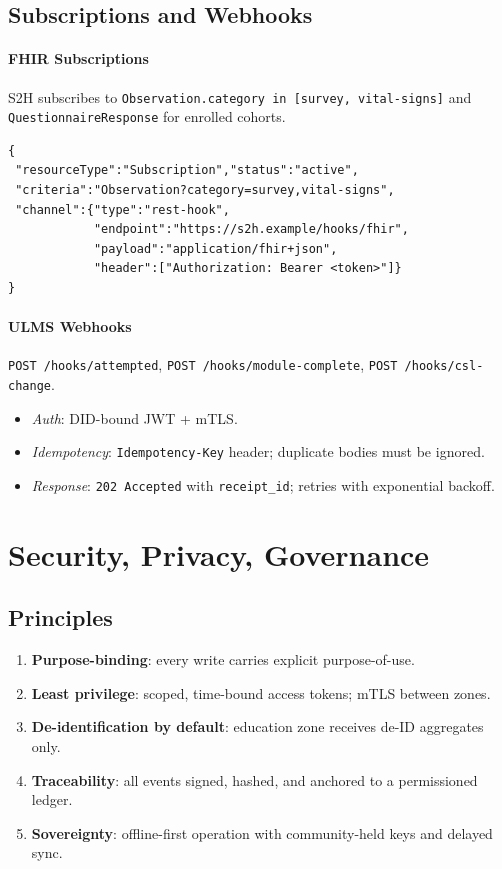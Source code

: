 \documentclass[11pt]{article}
\theoremstyle{plain}
\begin{document}
\bigskip
\subsection{Subscriptions and Webhooks}\label{sec:subs-webhooks}

\paragraph{FHIR Subscriptions}
S2H subscribes to \texttt{Observation.category in [survey, vital-signs]} and \texttt{QuestionnaireResponse} for enrolled cohorts.
\begin{verbatim}
{
 "resourceType":"Subscription","status":"active",
 "criteria":"Observation?category=survey,vital-signs",
 "channel":{"type":"rest-hook",
            "endpoint":"https://s2h.example/hooks/fhir",
            "payload":"application/fhir+json",
            "header":["Authorization: Bearer <token>"]}
}
\end{verbatim}

\paragraph{ULMS Webhooks}
\texttt{POST /hooks/attempted}, \texttt{POST /hooks/module-complete}, \texttt{POST /hooks/csl-change}.
\begin{itemize}
  \item \emph{Auth}: DID-bound JWT + mTLS.
  \item \emph{Idempotency}: \texttt{Idempotency-Key} header; duplicate bodies must be ignored.
  \item \emph{Response}: \texttt{202 Accepted} with \texttt{receipt\_id}; retries with exponential backoff.
\end{itemize}



\section{Security, Privacy, Governance}

\subsection{Principles}
\begin{enumerate}
  \item \textbf{Purpose-binding}: every write carries explicit purpose-of-use.
  \item \textbf{Least privilege}: scoped, time-bound access tokens; mTLS between zones.
  \item \textbf{De-identification by default}: education zone receives de-ID aggregates only.
  \item \textbf{Traceability}: all events signed, hashed, and anchored to a permissioned ledger.
  \item \textbf{Sovereignty}: offline-first operation with community-held keys and delayed sync.
\end{enumerate}
\end{document}
